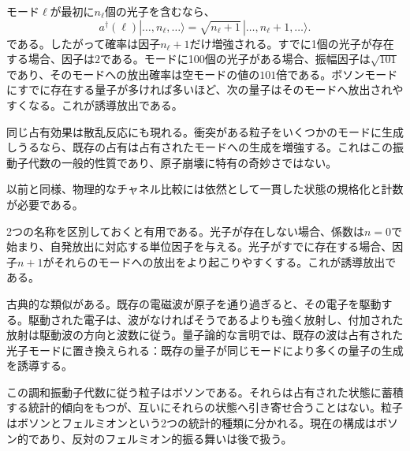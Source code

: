 モード\(\ell\)が最初に\(n_\ell\)個の光子を含むなら、
\begin{equation}
a^\dagger(\ell)
|\ldots,n_\ell,\ldots\rangle
=
\sqrt{n_\ell+1}
\,|\ldots,n_\ell+1,\ldots\rangle.
\end{equation}
である。したがって確率は因子\(n_\ell+1\)だけ増強される。すでに1個の光子が存在する場合、因子は\(2\)である。モードに100個の光子がある場合、振幅因子は\(\sqrt{101}\)であり、そのモードへの放出確率は空モードの値の\(101\)倍である。ボソンモードにすでに存在する量子が多ければ多いほど、次の量子はそのモードへ放出されやすくなる。これが誘導放出である。

同じ占有効果は散乱反応にも現れる。衝突がある粒子をいくつかのモードに生成しうるなら、既存の占有は占有されたモードへの生成を増強する。これはこの振動子代数の一般的性質であり、原子崩壊に特有の奇妙さではない。

\begin{classroomqa}
\end{classroomqa}

以前と同様、物理的なチャネル比較には依然として一貫した状態の規格化と計数が必要である。

\begin{classroomqa}
\end{classroomqa}

2つの名称を区別しておくと有用である。光子が存在しない場合、係数は\(n=0\)で始まり、自発放出に対応する単位因子を与える。光子がすでに存在する場合、因子\(n+1\)がそれらのモードへの放出をより起こりやすくする。これが誘導放出である。

古典的な類似がある。既存の電磁波が原子を通り過ぎると、その電子を駆動する。駆動された電子は、波がなければそうであるよりも強く放射し、付加された放射は駆動波の方向と波数に従う。量子論的な言明では、既存の波は占有された光子モードに置き換えられる：既存の量子が同じモードにより多くの量子の生成を誘導する。

この調和振動子代数に従う粒子はボソンである。それらは占有された状態に蓄積する統計的傾向をもつが、互いにそれらの状態へ引き寄せ合うことはない。粒子はボソンとフェルミオンという2つの統計的種類に分かれる。現在の構成はボソン的であり、反対のフェルミオン的振る舞いは後で扱う。

